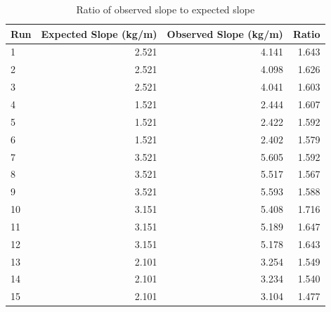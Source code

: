 %
\begin{table}[ht]
    \centering
    \begin{tabular}{|l|r|r|r|}
        \hline
        Run & Expected Slope (kg/m) & Observed Slope (kg/m) & Ratio \\
        \hline
        1 & 2.521 & 4.141 & 1.643 \\
        2 & 2.521 & 4.098 & 1.626 \\
        3 & 2.521 & 4.041 & 1.603 \\
        \hline
        4 & 1.521 & 2.444 & 1.607 \\
        5 & 1.521 & 2.422 & 1.592 \\
        6 & 1.521 & 2.402 & 1.579 \\
        \hline
        7 & 3.521 & 5.605 & 1.592 \\
        8 & 3.521 & 5.517 & 1.567 \\
        9 & 3.521 & 5.593 & 1.588 \\
        \hline
        10 & 3.151 & 5.408 & 1.716 \\
        11 & 3.151 & 5.189 & 1.647 \\
        12 & 3.151 & 5.178 & 1.643 \\
        \hline
        13 & 2.101 & 3.254 & 1.549 \\
        14 & 2.101 & 3.234 & 1.540 \\
        15 & 2.101 & 3.104 & 1.477 \\
        \hline
    \end{tabular}
    \caption{Ratio of observed slope to expected slope}
    \label{table.10.ratio}
\end{table}
%
\newpage

